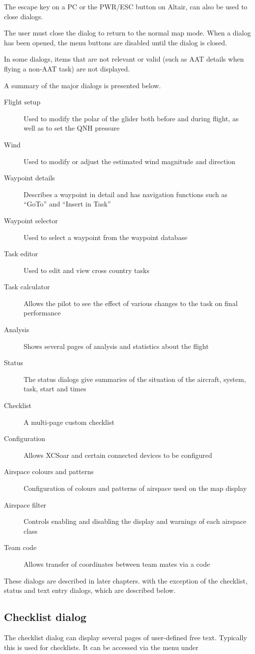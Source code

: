 \documentclass[a4paper,12pt]{refrep}
\begin{document}
The escape key on a PC or the PWR/ESC button on Altair, can also be used to
close dialogs.

The user must close the dialog to return to the normal map mode. When a dialog
has been opened, the menu buttons are disabled until the dialog is closed.

In some dialogs, items that are not relevant or valid (such as AAT details when
flying a non-AAT task) are not displayed.

A summary of the major dialogs is presented below.
\begin{description}
\item[Flight setup] Used to modify the polar of the glider both before and
during flight, as well as to set the QNH pressure
\item[Wind] Used to modify or adjust the estimated wind magnitude and direction
\item[Waypoint details] Describes a waypoint in detail and has navigation
functions such as ``GoTo'' and ``Insert in Task''
\item[Waypoint selector] Used to select a waypoint from the waypoint database
\item[Task editor] Used to edit and view cross country tasks
\item[Task calculator] Allows the pilot to see the effect of various changes to
the task on final performance
\item[Analysis] Shows several pages of analysis and statistics about the flight
\item[Status] The status dialogs give summaries of the situation of the 
aircraft, system, task, start and times
\item[Checklist] A multi-page custom checklist
\item[Configuration] Allows XCSoar and certain connected devices to be
configured
\item[Airspace colours and patterns] Configuration of colours and patterns of
airspace used on the map display
\item[Airspace filter] Controls enabling and disabling the display and warnings
of each airspace class
\item[Team code] Allows transfer of coordinates between team mates via a code
\end{description}

These dialogs are described in later chapters. with the exception of the
checklist, status and text entry dialogs, which are described below.

\subsection*{Checklist dialog}
The checklist dialog can display several pages of user-defined free text.
Typically this is used for checklists. It can be accessed via the menu under 
\begin{quote}
\blink{}
\end{quote}
\end{document}

